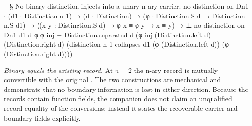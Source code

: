 \documentclass[11pt]{article}
\begin{document}
\begin{code}
-- § No binary distinction injects into a unary n-ary carrier.
no-distinction-on-Dn1 :
  (d1 : Distinction-n 1) →
  (d  : Distinction) →
  (φ  : Distinction.S d → Distinction-n.S d1) →
  ((x y : Distinction.S d) → φ x ≡ φ y → x ≡ y) →
  ⊥
no-distinction-on-Dn1 d1 d φ φ-inj =
  Distinction.separated d
    (φ-inj (Distinction.left d) (Distinction.right d)
      (distinction-n-1-collapses d1
        (φ (Distinction.left d))
        (φ (Distinction.right d))))
\end{code}

\emph{Binary equals the existing record.}  At $n=2$ the n-ary record
is mutually convertible with the original .
The two constructions are mechanical and demonstrate that no boundary
information is lost in either direction.  Because the records contain
function fields, the companion does not claim an unqualified record
equality of the conversions; instead it states the recoverable carrier
and boundary fields explicitly.
\end{document}
